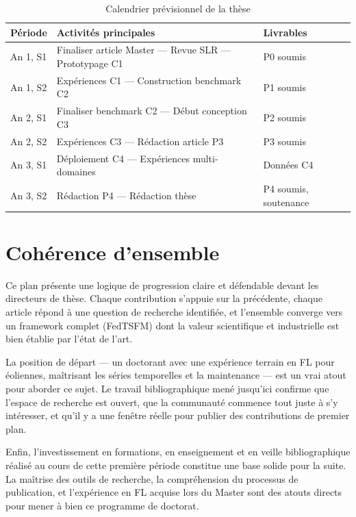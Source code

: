 \documentclass[12pt, a4paper]{report}
\begin{document}
\begin{table}[h!]
\centering
\caption{Calendrier prévisionnel de la thèse}
\label{tab:calendar}
\renewcommand{\arraystretch}{1.6}
\begin{tabularx}{\textwidth}{lXl}
\toprule
Période & Activités principales & Livrables \\
\midrule
An 1, S1 & Finaliser article Master — Revue SLR — Prototypage C1 & P0 soumis \\
An 1, S2 & Expériences C1 — Construction benchmark C2 & P1 soumis \\
An 2, S1 & Finaliser benchmark C2 — Début conception C3 & P2 soumis \\
An 2, S2 & Expériences C3 — Rédaction article P3 & P3 soumis \\
An 3, S1 & Déploiement C4 — Expériences multi-domaines & Données C4 \\
An 3, S2 & Rédaction P4 — Rédaction thèse & P4 soumis, soutenance \\
\bottomrule
\end{tabularx}
\end{table}

\section{Cohérence d'ensemble}

Ce plan présente une logique de progression claire et défendable devant les directeurs
de thèse. Chaque contribution s'appuie sur la précédente, chaque article répond à une
question de recherche identifiée, et l'ensemble converge vers un framework complet
(FedTSFM) dont la valeur scientifique et industrielle est bien établie par l'état de l'art.

La position de départ --- un doctorant avec une expérience terrain en FL pour éoliennes,
maîtrisant les séries temporelles et la maintenance --- est un vrai atout pour aborder
ce sujet. Le travail bibliographique mené jusqu'ici confirme que l'espace de recherche
est ouvert, que la communauté commence tout juste à s'y intéresser, et qu'il y a une
fenêtre réelle pour publier des contributions de premier plan.

Enfin, l'investissement en formations, en enseignement et en veille bibliographique
réalisé au cours de cette première période constitue une base solide pour la suite.
La maîtrise des outils de recherche, la compréhension du processus de publication,
et l'expérience en FL acquise lors du Master sont des atouts directs pour mener à bien
ce programme de doctorat.
\end{document}
